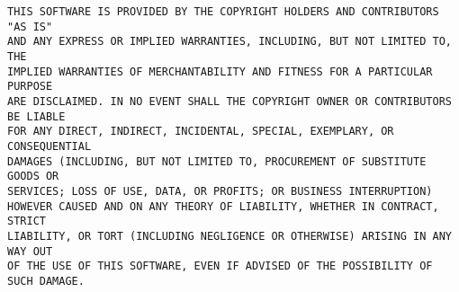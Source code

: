 \documentclass{book}
\begin{document}
\begin{verbatim}
THIS SOFTWARE IS PROVIDED BY THE COPYRIGHT HOLDERS AND CONTRIBUTORS "AS IS"
AND ANY EXPRESS OR IMPLIED WARRANTIES, INCLUDING, BUT NOT LIMITED TO, THE
IMPLIED WARRANTIES OF MERCHANTABILITY AND FITNESS FOR A PARTICULAR PURPOSE
ARE DISCLAIMED. IN NO EVENT SHALL THE COPYRIGHT OWNER OR CONTRIBUTORS BE LIABLE
FOR ANY DIRECT, INDIRECT, INCIDENTAL, SPECIAL, EXEMPLARY, OR CONSEQUENTIAL
DAMAGES (INCLUDING, BUT NOT LIMITED TO, PROCUREMENT OF SUBSTITUTE GOODS OR
SERVICES; LOSS OF USE, DATA, OR PROFITS; OR BUSINESS INTERRUPTION)
HOWEVER CAUSED AND ON ANY THEORY OF LIABILITY, WHETHER IN CONTRACT, STRICT
LIABILITY, OR TORT (INCLUDING NEGLIGENCE OR OTHERWISE) ARISING IN ANY WAY OUT
OF THE USE OF THIS SOFTWARE, EVEN IF ADVISED OF THE POSSIBILITY OF SUCH DAMAGE.
\end{verbatim}


\newpage

\pagestyle{fancyplain}










\end{document}

